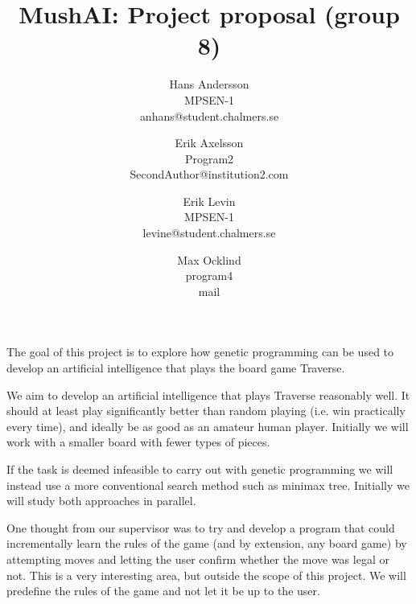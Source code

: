 \documentclass[times, 10pt,twocolumn]{article}
\begin{document}
\title{MushAI: Project proposal (group 8)}

\author{Hans Andersson\\
MPSEN-1\\anhans@student.chalmers.se\\
\and
Erik Axelsson\\
Program2\\
SecondAuthor@institution2.com\\
\and
Erik Levin\\
MPSEN-1\\
levine@student.chalmers.se
\and
Max Ocklind\\
program4\\
mail
}

\maketitle
\thispagestyle{empty}



The goal of this project is to explore how genetic programming can be used to develop an artificial intelligence that plays the board game Traverse.



We aim to develop an artificial intelligence that plays Traverse reasonably well. It should at least play significantly better than random playing (i.e. win practically every time), and ideally be as good as an amateur human player. Initially we will work with a smaller board with fewer types of pieces.

If the task is deemed infeasible to carry out with genetic programming we will instead use a more conventional search method such as minimax tree. Initially we will study both approaches in parallel.


One thought from our supervisor was to try and develop a program that could incrementally learn the rules of the game (and by extension, any board game) by attempting moves and letting the user confirm whether the move was legal or not. This is a very interesting area, but outside the scope of this project. We will predefine the rules of the game and not let it be up to the user.
\end{document}
